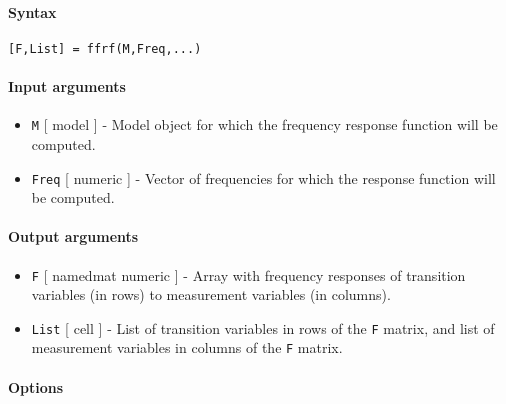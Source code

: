


	\paragraph{Syntax}\label{syntax}

\begin{verbatim}
[F,List] = ffrf(M,Freq,...)
\end{verbatim}

\paragraph{Input arguments}\label{input-arguments}

\begin{itemize}
\item
  \texttt{M} {[} model {]} - Model object for which the frequency
  response function will be computed.
\item
  \texttt{Freq} {[} numeric {]} - Vector of frequencies for which the
  response function will be computed.
\end{itemize}

\paragraph{Output arguments}\label{output-arguments}

\begin{itemize}
\item
  \texttt{F} {[} namedmat \textbar{} numeric {]} - Array with frequency
  responses of transition variables (in rows) to measurement variables
  (in columns).
\item
  \texttt{List} {[} cell {]} - List of transition variables in rows of
  the \texttt{F} matrix, and list of measurement variables in columns of
  the \texttt{F} matrix.
\end{itemize}

\paragraph{Options}\label{options}

